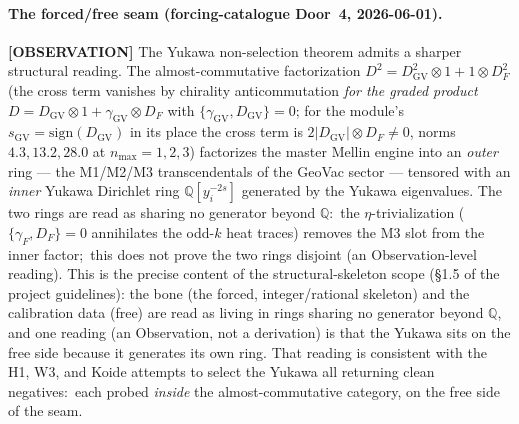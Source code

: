 \documentclass[11pt]{article}
\begin{document}
\paragraph{The forced/free seam (forcing-catalogue Door~4, 2026-06-01).}
\textbf{[OBSERVATION]} The Yukawa non-selection theorem admits a sharper structural reading.
The almost-commutative factorization $D^2 = D_{\mathrm{GV}}^2 \otimes 1
+ 1 \otimes D_F^2$ (the cross term vanishes by chirality
anticommutation \emph{for the graded product} $D = D_{\mathrm{GV}} \otimes
1 + \gamma_{\mathrm{GV}} \otimes D_F$ with $\{\gamma_{\mathrm{GV}},
D_{\mathrm{GV}}\} = 0$; for the module's $s_{\mathrm{GV}} =
\mathrm{sign}(D_{\mathrm{GV}})$ in its place the cross term is $2|D_{\mathrm{GV}}|
\otimes D_F \ne 0$, norms $4.3, 13.2, 28.0$ at $n_{\max} = 1, 2, 3$)
factorizes the master Mellin engine into an
\emph{outer} ring --- the M1/M2/M3 transcendentals of the GeoVac
sector --- tensored with an \emph{inner} Yukawa Dirichlet ring
$\mathbb{Q}[y_i^{-2s}]$ generated by the Yukawa eigenvalues. The two
rings are read as sharing no generator beyond $\mathbb{Q}$:\ the
$\eta$-trivialization ($\{\gamma_F, D_F\} = 0$ annihilates the odd-$k$
heat traces) removes the M3 slot from the inner factor;\ this does not prove the two rings disjoint (an
Observation-level reading). This is the precise content of the structural-skeleton
scope (\S 1.5 of the project guidelines): the bone (the forced,
integer/rational skeleton) and the calibration data (free) are read as
living in rings sharing no generator beyond $\mathbb{Q}$, and one reading (an
Observation, not a derivation) is that the Yukawa sits on the free side
because it generates its own ring.  That reading is consistent with the
H1, W3, and Koide attempts to select the Yukawa all returning clean
negatives:\ each probed \emph{inside} the almost-commutative category,
on the free side of the seam.
\end{document}

